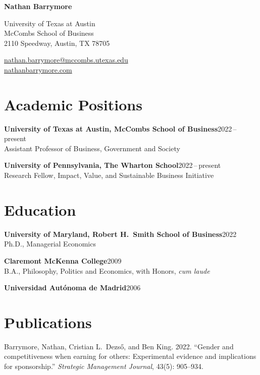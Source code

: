 \documentclass[11pt]{article}
\newcommand{\entry}[3]{\textbf{#1}\hfill #2\\#3\par\vspace{7pt}}
\newcommand{\pub}[1]{#1\par\vspace{6pt}}
\newcommand{\SMJ}{\textit{Strategic Management Journal}}
\begin{document}
\thispagestyle{first}

\begin{center}
  {\Large\textbf{Nathan Barrymore}}
\end{center}
\vspace{2pt}

\begin{minipage}[t]{0.5\textwidth}
University of Texas at Austin\\
McCombs School of Business\\
2110 Speedway, Austin, TX 78705
\end{minipage}%
\begin{minipage}[t]{0.5\textwidth}
\raggedleft
\href{mailto:nathan.barrymore@mccombs.utexas.edu}{nathan.barrymore@mccombs.utexas.edu}\\
\href{https://nathanbarrymore.com}{nathanbarrymore.com}
\end{minipage}

\section*{Academic Positions}

\entry{University of Texas at Austin, McCombs School of Business}{2022\,--\,present}
      {Assistant Professor of Business, Government and Society}
\entry{University of Pennsylvania, The Wharton School}{2022\,--\,present}
      {Research Fellow, Impact, Value, and Sustainable Business Initiative}

\section*{Education}

\entry{University of Maryland, Robert H.\ Smith School of Business}{2022}
      {Ph.D., Managerial Economics}
\entry{Claremont McKenna College}{2009}
      {B.A., Philosophy, Politics and Economics, with Honors, \textit{cum laude}}
\textbf{Universidad Autónoma de Madrid}\hfill 2006\par

\section*{Publications}

\pub{Barrymore, Nathan, Cristian L.\ Dezső, and Ben King. 2022. ``Gender and competitiveness when
earning for others: Experimental evidence and implications for sponsorship.'' \SMJ, 43(5):
905--934.}
\end{document}
